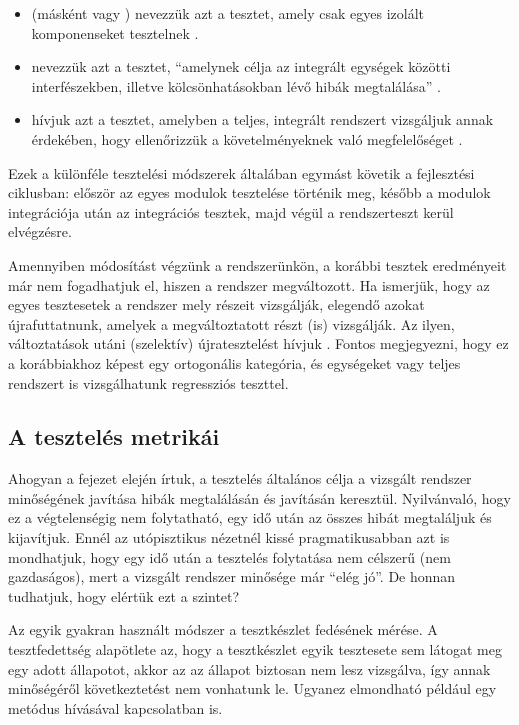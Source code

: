 \begin{itemize}
\item {} (másként  vagy ) nevezzük azt a tesztet, amely csak egyes izolált komponenseket tesztelnek \cite{HTB-glossary}.
\item {} nevezzük azt a tesztet, ``amelynek célja az integrált egységek közötti
interfészekben, illetve kölcsönhatásokban lévő hibák megtalálása''  \cite{HTB-glossary}.
\item {} hívjuk azt a tesztet, amelyben a teljes, integrált rendszert vizsgáljuk annak érdekében, hogy ellenőrizzük a követelményeknek való megfelelőséget \cite{HTB-glossary}.
\end{itemize}

Ezek a különféle tesztelési módszerek általában egymást követik a fejlesztési ciklusban: először az egyes modulok tesztelése történik meg, később a modulok integrációja után az integrációs tesztek, majd végül a rendszerteszt kerül elvégzésre.

Amennyiben módosítást végzünk a rendszerünkön, a korábbi tesztek eredményeit már nem fogadhatjuk el, hiszen a rendszer megváltozott. Ha ismerjük, hogy az egyes tesztesetek a rendszer mely részeit vizsgálják, elegendő azokat újrafuttatnunk, amelyek a megváltoztatott részt (is) vizsgálják. Az ilyen, változtatások utáni (szelektív) újratesztelést hívjuk . Fontos megjegyezni, hogy ez a korábbiakhoz képest egy ortogonális kategória, és egységeket vagy teljes rendszert is vizsgálhatunk regressziós teszttel. 

\subsection{A tesztelés metrikái}
Ahogyan a fejezet elején írtuk, a tesztelés általános célja a vizsgált rendszer minőségének javítása hibák megtalálásán és javításán keresztül. Nyilvánvaló, hogy ez a végtelenségig nem folytatható, egy idő után az összes hibát megtaláljuk és kijavítjuk. Ennél az utópisztikus nézetnél kissé pragmatikusabban azt is mondhatjuk, hogy egy idő után a tesztelés folytatása nem célszerű (nem gazdaságos), mert a vizsgált rendszer minősége már ``elég jó''. %
De honnan tudhatjuk, hogy elértük ezt a szintet?

Az egyik gyakran használt módszer a tesztkészlet fedésének mérése. A tesztfedettség alapötlete az, hogy a tesztkészlet egyik tesztesete sem látogat meg egy adott állapotot, akkor az az állapot biztosan nem lesz vizsgálva, így annak minőségéről következtetést nem vonhatunk le. Ugyanez elmondható például egy metódus hívásával kapcsolatban is.

